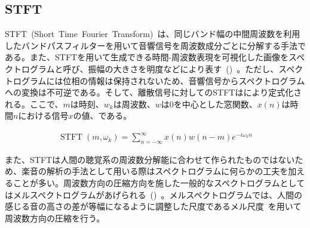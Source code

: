 \subsection{STFT}

STFT~(Short~Time~Fourier~Transform)~は、同じバンド幅の中間周波数を利用したバンドパスフィルターを用いて音響信号を周波数成分ごとに分解する手法である。また、STFTを用いて生成できる時間-周波数表現を可視化した画像をスペクトログラムと呼び、振幅の大きさを明度などにより表す~()~。ただし、スペクトログラムには位相の情報は保持されないため、音響信号からスペクトログラムへの変換は不可逆である。そして、離散信号に対してのSTFTはにより定式化される。ここで、$m$は時刻、$w_k$は周波数、$w$は0を中心とした窓関数、$x(n)$は時間$n$における信号$x$の値、である。

\begin{align}
    \label{eq:STFT}
    \operatorname{STFT}\left(m, \omega_k\right)=\sum_{n=-\infty}^{\infty} x(n) w(n-m) e^{-i \omega_k n}
\end{align}

また、STFTは人間の聴覚系の周波数分解能に合わせて作られたものではないため、楽音の解析の手法として用いる際はスペクトログラムに何らかの工夫を加えることが多い。周波数方向の圧縮方向を施した一般的なスペクトログラムとしてはメルスペクトログラムがあげられる~()~。メルスペクトログラムでは、人間の感じる音の高さの差が等幅になるように調整した尺度であるメル尺度~\cite{melscale}を用いて周波数方向の圧縮を行う。

